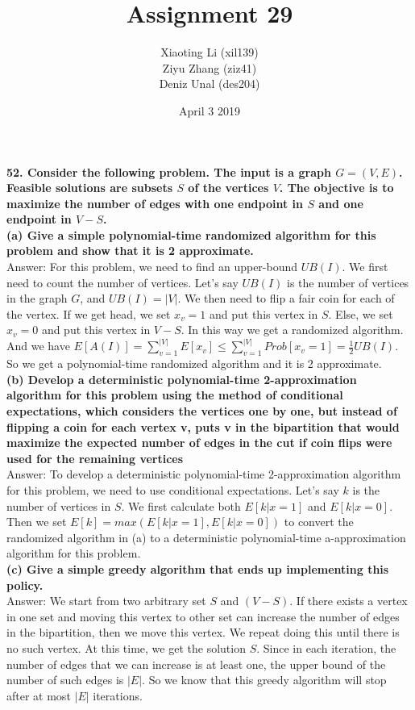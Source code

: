\documentclass{article}
\title{Assignment 29}
\author{Xiaoting Li (xil139) \\
Ziyu Zhang (ziz41) \\
Deniz Unal (des204)}
\date{April 3 2019}
\begin{document}
\maketitle
\noindent
\textbf{52. Consider the following problem. The input is a graph $G = (V, E)$. Feasible solutions are subsets $S$ of the vertices $V$. The objective is to maximize the number of edges with one endpoint in $S$ and one endpoint in $V-S$.} \\ \newline
\textbf{(a) Give a simple polynomial-time randomized algorithm for this problem and show that it is 2 approximate.} \\ \newline
Answer: For this problem, we need to find an upper-bound $UB(I)$. We first need to count the number of vertices. Let's say $UB(I)$ is the number of vertices in the graph $G$, and $UB(I) = |V|$. We then need to flip a fair coin for each of the vertex. If we get head, we set $x_v = 1$ and put this vertex in $S$. Else, we set $x_v = 0$ and put this vertex in $V - S$. In this way we get a randomized algorithm. And we have $E[A(I)] = \sum_{v=1}^{|V|}E[x_v] \leq \sum_{v=1}^{|V|}Prob[x_v = 1] = \frac{1}{2}UB(I)$. So we get a polynomial-time randomized algorithm and it is 2 approximate.\\ \newline
\textbf{(b) Develop a deterministic polynomial-time 2-approximation algorithm for this problem using the method of conditional expectations, which considers the vertices one by one, but instead of flipping a coin for each vertex v, puts v in the bipartition that would maximize the expected number of edges in the cut if coin flips were used for the remaining vertices} \\ \newline
Answer: To develop a deterministic polynomial-time 2-approximation algorithm for this problem, we need to use conditional expectations. Let's say $k$ is the number of vertices in $S$. We first calculate both $E[k|x = 1]$ and $E[k|x=0]$. Then we set $E[k] = max(E[k|x = 1], E[k|x=0])$ to convert the randomized algorithm in (a) to a deterministic polynomial-time a-approximation algorithm for this problem. \\ \newline
\textbf{(c) Give a simple greedy algorithm that ends up implementing this policy.} \\ \newline
Answer: We start from two arbitrary set $S$ and $(V - S)$. If there exists a vertex in one set and moving this vertex to other set can increase the number of edges in the bipartition, then we move this vertex. We repeat doing this until there is no such vertex. At this time, we get the solution $S$. Since in each iteration, the number of edges that we can increase is at least one, the upper bound of the number of such edges is $|E|$. So we know that this greedy algorithm will stop after at most $|E|$ iterations.\\ \newline
\end{document}
